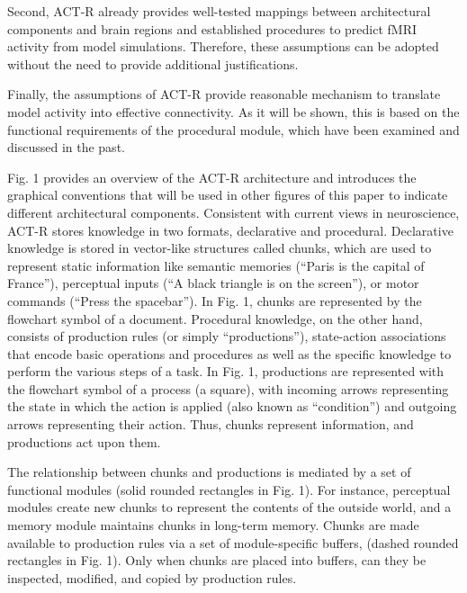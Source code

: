 \documentclass[10pt,letterpaper]{article}
\begin{document}
Second, ACT-R already provides well-tested mappings between architectural components and brain regions and established procedures to predict fMRI activity from model simulations. Therefore, these assumptions can be adopted without the need to provide additional justifications.

Finally, the assumptions of ACT-R provide reasonable mechanism to translate model activity into effective connectivity. As it will be shown, this is based on the functional requirements of the procedural module, which have been examined and discussed in the past.

Fig. 1 provides an overview of the ACT-R architecture and introduces the graphical conventions that will be used in other figures of this paper to indicate different architectural components. Consistent with current views in neuroscience, ACT-R stores knowledge in two formats, declarative and procedural. Declarative knowledge is stored in vector-like structures called chunks, which are used to represent static information like semantic memories (“Paris is the capital of France”), perceptual inputs (“A black triangle is on the screen”), or motor commands (“Press the spacebar”). In Fig. 1, chunks are represented by the flowchart symbol of a document. Procedural knowledge, on the other hand, consists of production rules (or simply “productions”), state-action associations that encode basic operations and procedures as well as the specific knowledge to perform the various steps of a task. In Fig. 1, productions are represented with the flowchart symbol of a process (a square), with incoming arrows representing the state in which the action is applied (also known as ``condition'') and outgoing arrows representing their action. Thus, chunks represent information, and productions act upon them.

The relationship between chunks and productions is mediated by a set of functional modules (solid rounded rectangles in Fig. 1). For instance, perceptual modules create new chunks to represent the contents of the outside world, and a memory module maintains chunks in long-term memory. Chunks are made available to production rules via a set of module-specific buffers, (dashed rounded rectangles in Fig. 1). Only when chunks are placed into buffers, can they be inspected, modified, and copied by production rules. 
\end{document}
